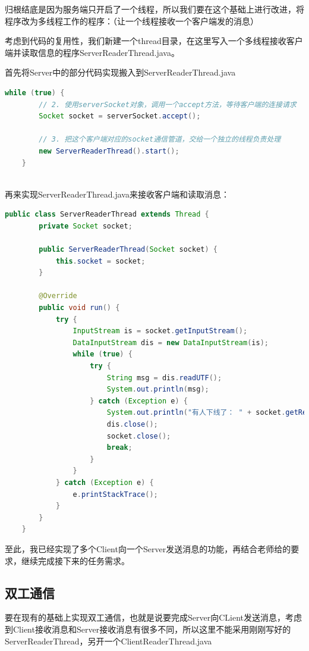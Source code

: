 \documentclass{article}
\begin{document}
	归根结底是因为服务端只开启了一个线程，所以我们要在这个基础上进行改进，将程序改为多线程工作的程序：（让一个线程接收一个客户端发的消息）
	
	考虑到代码的复用性，我们新建一个thread目录，在这里写入一个多线程接收客户端并读取信息的程序ServerReaderThread.java。
	
	首先将Server中的部分代码实现搬入到ServerReaderThread.java
	
	\begin{lstlisting}[language=Java, title=简化的Server, tabsize=4]
	while (true) {
		// 2. 使用serverSocket对象，调用一个accept方法，等待客户端的连接请求
		Socket socket = serverSocket.accept();
		
		// 3. 把这个客户端对应的socket通信管道，交给一个独立的线程负责处理
		new ServerReaderThread().start();
	}
	
	\end{lstlisting}
	
	再来实现ServerReaderThread.java来接收客户端和读取消息：
	
	\begin{lstlisting}[language=Java, title=初步实现ServerReaderThread.java, tabsize=4]
	public class ServerReaderThread extends Thread {
		private Socket socket;
		
		public ServerReaderThread(Socket socket) {
			this.socket = socket;
		}
		
		@Override
		public void run() {
			try {
				InputStream is = socket.getInputStream();
				DataInputStream dis = new DataInputStream(is);
				while (true) {
					try {
						String msg = dis.readUTF();
						System.out.println(msg);
					} catch (Exception e) {
						System.out.println("有人下线了： " + socket.getRemoteSocketAddress());
						dis.close();
						socket.close();
						break;
					}
				}
			} catch (Exception e) {
				e.printStackTrace();
			}
		}
	}
	\end{lstlisting}
	
	至此，我已经实现了多个Client向一个Server发送消息的功能，再结合老师给的要求，继续完成接下来的任务需求。
	
	\subsection{双工通信}
	
	要在现有的基础上实现双工通信，也就是说要完成Server向CLient发送消息，考虑到Client接收消息和Server接收消息有很多不同，所以这里不能采用刚刚写好的ServerReaderThread，另开一个ClientReaderThread.java
	
\end{document}
